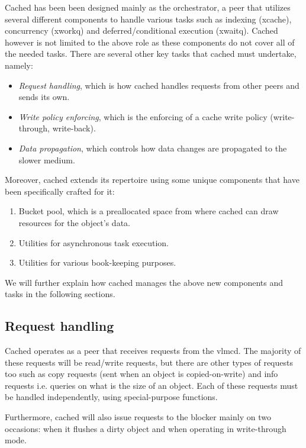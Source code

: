 
Cached has been been designed mainly as the orchestrator, a peer that utilizes 
several different components to handle various tasks such as indexing (xcache), 
concurrency (xworkq) and deferred/conditional execution (xwaitq). Cached 
however is not limited to the above role as these components do not cover all 
of the needed tasks. There are several other key tasks that cached must 
undertake, namely:

\begin{itemize}
	\item \textit{Request handling}, which is how cached handles requests 
		from other peers and sends its own.
	\item \textit{Write policy enforcing}, which is the enforcing of a 
		cache write policy (write-through, write-back).
	\item \textit{Data propagation}, which controls how data changes are 
		propagated to the slower medium.
\end{itemize}

Moreover, cached extends its repertoire using some unique components that have
been specifically crafted for it:

\begin{enumerate}
	\item Bucket pool, which is a preallocated space from where cached can draw 
		resources for the object's data.
	\item Utilities for asynchronous task execution.
	\item Utilities for various book-keeping purposes.
\end{enumerate}

We will further explain how cached manages the above new components and tasks 
in the following sections.

\subsection{Request handling}

Cached operates as a peer that receives requests from the vlmcd. The majority of 
these requests will be read/write requests, but there are other types of 
requests too such as copy requests (sent when an object is copied-on-write) and 
info requests i.e. queries on what is the size of an object. Each of these 
requests must be handled independently, using special-purpose functions.

Furthermore, cached will also issue requests to the blocker mainly on two 
occasions: when it flushes a dirty object and when operating in write-through 
mode.

